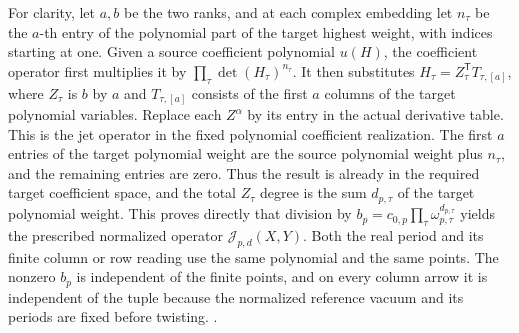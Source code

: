For clarity, let \(a,b\) be the two ranks, and at each complex
embedding let \(n_\tau\) be the \(a\)-th entry of the polynomial
part of the target highest weight, with indices starting at
one. Given a source coefficient polynomial \(u(H)\), the
coefficient operator first multiplies it by
\(\prod_\tau\det(H_\tau)^{n_\tau}\). It then substitutes
\(H_\tau=Z_\tau^{\mathsf T}T_{\tau,[a]}\), where \(Z_\tau\)
is \(b\) by \(a\) and \(T_{\tau,[a]}\) consists of the first
\(a\) columns of the target polynomial variables. Replace
each \(Z^\alpha\) by its entry in the actual derivative table.
This is the jet operator in the fixed polynomial coefficient
realization. The first \(a\) entries of the target polynomial
weight are the source polynomial weight plus \(n_\tau\),
and the remaining entries are zero. Thus the result is
already in the required target coefficient space, and the
total \(Z_\tau\) degree is the sum \(d_{p,\tau}\) of the target
polynomial weight. This proves directly that division by
\(b_p=c_{0,p}\prod_\tau\omega_{p,\tau}^{d_{p,\tau}}\) yields
the prescribed normalized operator
\(\mathcal J_{p,d}(X,Y)\). Both the real period and its finite
column or row reading use the same polynomial and the same
points. The nonzero \(b_p\) is independent of the finite
points, and on every column arrow it is independent of the
tuple because the normalized reference vacuum and its
periods are fixed before twisting.
.

